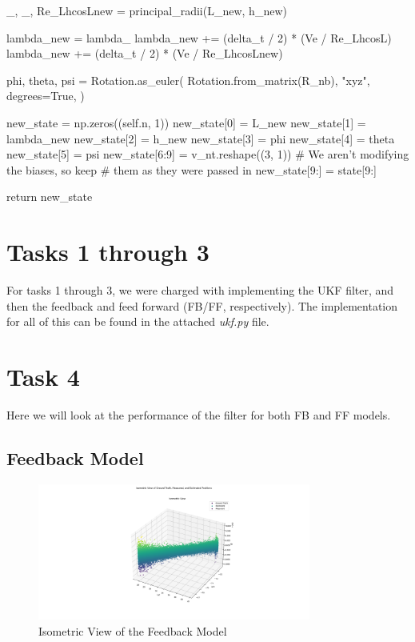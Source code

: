 \documentclass{article}
\begin{document}
\begin{python}
    _, _, Re_LhcosLnew = principal_radii(L_new, h_new)

    lambda_new = lambda_
    lambda_new += (delta_t / 2) * (Ve / Re_LhcosL)
    lambda_new += (delta_t / 2) * (Ve / Re_LhcosLnew)

    phi, theta, psi = Rotation.as_euler(
    Rotation.from_matrix(R_nb),
    "xyz",
    degrees=True,
    )

    new_state = np.zeros((self.n, 1))
    new_state[0] = L_new
    new_state[1] = lambda_new
    new_state[2] = h_new
    new_state[3] = phi
    new_state[4] = theta
    new_state[5] = psi
    new_state[6:9] = v_nt.reshape((3, 1))
    # We aren't modifying the biases, so keep
    # them as they were passed in
    new_state[9:] = state[9:]

    return new_state
\end{python}

\section*{Tasks 1 through 3}

For tasks 1 through 3, we were charged with implementing the UKF filter, and then the feedback and feed forward (FB/FF, respectively). The implementation for all of this can be found in the attached \textit{ukf.py} file.

\section*{Task 4}

Here we will look at the performance of the filter for both FB and FF models.

\subsection*{Feedback Model}

\begin{figure}[H]
    \centering
    \includegraphics[width=0.8\textwidth]{./imgs/FB_isometric.png}
    \caption{Isometric View of the Feedback Model}
\end{figure}
\end{document}
